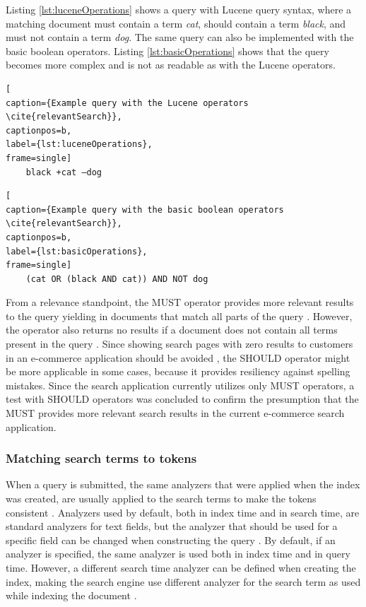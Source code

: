 Listing \ref{lst:luceneOperations} shows a query with Lucene query syntax, where a matching document must contain a term \emph{cat},
should contain a term \emph{black}, and must not contain a term \emph{dog}.
The same query can also be implemented with the basic boolean operators.
Listing \ref{lst:basicOperations} shows that the query becomes more complex and is not as readable as with the Lucene operators.
\cite{relevantSearch}
\begin{lstlisting}[
caption={Example query with the Lucene operators \cite{relevantSearch}},
captionpos=b,
label={lst:luceneOperations},
frame=single]
    black +cat –dog
\end{lstlisting}
\begin{lstlisting}[
caption={Example query with the basic boolean operators \cite{relevantSearch}},
captionpos=b,
label={lst:basicOperations},
frame=single]
    (cat OR (black AND cat)) AND NOT dog
\end{lstlisting}


From a relevance standpoint, the MUST operator provides more relevant results to the query 
yielding in documents that match all parts of the query \cite{relevantSearch}.
However, the operator also returns no results if a document does not contain all terms present in the query \cite{relevantSearch}.
Since showing search pages with zero results to customers in an e-commerce application should be avoided \cite{zeroResults},
the SHOULD operator might be more applicable in some cases, because it provides resiliency against spelling mistakes.
Since the search application currently utilizes only MUST operators, a test with SHOULD operators was concluded
to confirm the presumption that the MUST provides more relevant search results in the current e-commerce search application.



\subsubsection{Matching search terms to tokens}
\label{ss:matchingTokens}

When a query is submitted, the same analyzers that were applied when the index was created, 
are usually applied to the search terms to make the tokens consistent
\cite{relevantSearch}.
Analyzers used by default, both in index time and in search time, are standard analyzers for text fields,
but the analyzer that should be used for a specific field can be changed when constructing the query
\cite{elasticIntro}.
By default, if an analyzer is specified, the same analyzer is used both in index time and in query time.
However, a different search time analyzer can be defined when creating the index, making the search engine
use different analyzer for the search term as used while indexing the document \cite{relevantSearch}.


